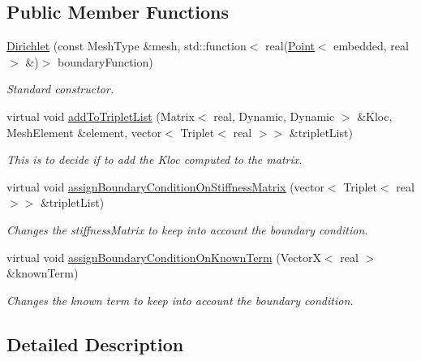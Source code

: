 \subsection*{\-Public \-Member \-Functions}
\begin{DoxyCompactItemize}
\item 
\hypertarget{class_dirichlet_af94781839af8702da778a451157b8b58}{\hyperlink{class_dirichlet_af94781839af8702da778a451157b8b58}{\-Dirichlet} (const \-Mesh\-Type \&mesh, std\-::function$<$ real(\hyperlink{class_point}{\-Point}$<$ embedded, real $>$ \&)$>$ boundary\-Function)}\label{class_dirichlet_af94781839af8702da778a451157b8b58}

\begin{DoxyCompactList}\small\item\em \-Standard constructor. \end{DoxyCompactList}\item 
virtual void \hyperlink{class_dirichlet_a8fc4c08f205989873d3c0a7fcd82cfa4}{add\-To\-Triplet\-List} (\-Matrix$<$ real, \-Dynamic, \-Dynamic $>$ \&\-Kloc, \-Mesh\-Element \&element, vector$<$ \-Triplet$<$ real $>$$>$ \&triplet\-List)
\begin{DoxyCompactList}\small\item\em \-This is to decide if to add the \-Kloc computed to the matrix. \end{DoxyCompactList}\item 
virtual void \hyperlink{class_dirichlet_ade7dd97b00bf71bbed49e52954f7df96}{assign\-Boundary\-Condition\-On\-Stiffness\-Matrix} (vector$<$ \-Triplet$<$ real $>$$>$ \&triplet\-List)
\begin{DoxyCompactList}\small\item\em \-Changes the stiffness\-Matrix to keep into account the boundary condition. \end{DoxyCompactList}\item 
virtual void \hyperlink{class_dirichlet_ac10baf3c4fa3e987a2e194899f9c4d39}{assign\-Boundary\-Condition\-On\-Known\-Term} (\-Vector\-X$<$ real $>$ \&known\-Term)
\begin{DoxyCompactList}\small\item\em \-Changes the known term to keep into account the boundary condition. \end{DoxyCompactList}\end{DoxyCompactItemize}


\subsection{\-Detailed \-Description}
